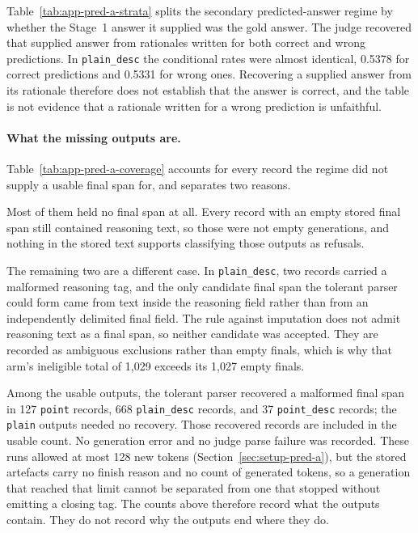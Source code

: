 Table~\ref{tab:app-pred-a-strata} splits the secondary predicted-answer regime
by whether the Stage~1 answer it supplied was the gold answer. The judge
recovered that supplied answer from rationales written for both correct and
wrong predictions. In \texttt{plain\_desc} the conditional rates were almost
identical, 0.5378 for correct predictions and 0.5331 for wrong ones. Recovering
a supplied answer from its rationale therefore does not establish that the
answer is correct, and the table is not evidence that a rationale written for a
wrong prediction is unfaithful.



\paragraph{What the missing outputs are.}
Table~\ref{tab:app-pred-a-coverage} accounts for every record the regime did not
supply a usable final span for, and separates two reasons.

Most of them held no final span at all. Every record with an empty stored final
span still contained reasoning text, so those were not empty generations, and
nothing in the stored text supports classifying those outputs as refusals.

The remaining two are a different case. In \texttt{plain\_desc}, two records
carried a malformed reasoning tag, and the only candidate final span the
tolerant parser could form came from text inside the reasoning field rather than
from an independently delimited final field. The rule against imputation does
not admit reasoning text as a final span, so neither candidate was accepted.
They are recorded as ambiguous exclusions rather than empty finals, which is why
that arm's ineligible total of 1,029 exceeds its 1,027 empty finals.

Among the usable outputs, the tolerant parser recovered a malformed final span
in 127 \texttt{point} records, 668 \texttt{plain\_desc} records, and 37
\texttt{point\_desc} records; the \texttt{plain} outputs needed no recovery.
Those recovered records are included in the usable count. No
generation error and no judge parse failure was recorded. These runs allowed at
most 128 new tokens (Section~\ref{sec:setup-pred-a}), but the stored artefacts
carry no finish reason and no count of generated tokens, so a generation that
reached that limit cannot be separated from one that stopped without emitting a
closing tag. The counts above therefore record what the outputs contain. They do not record
why the outputs end where they do.


